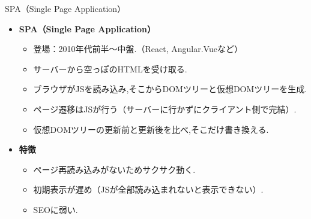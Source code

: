 \documentclass[aspectratio=169]{beamer}
\begin{document}
\begin{frame}{SPA（Single Page Application）}
    \begin{itemize}
        \setlength{\parskip}{1em}
        \item\textbf{SPA（Single Page Application）}
        \begin{itemize}
            \setlength{\parskip}{1em}
            \item 登場：2010年代前半～中盤.（React, Angular.Vueなど）
            \item サーバーから空っぽのHTMLを受け取る.
            \item ブラウザがJSを読み込み,そこからDOMツリーと仮想DOMツリーを生成.
            \item ページ遷移はJSが行う（サーバーに行かずにクライアント側で完結）.
            \item 仮想DOMツリーの更新前と更新後を比べ,そこだけ書き換える.
        \end{itemize}
        \item\textbf{特徴}
        \begin{itemize}
            \setlength{\parskip}{1em}
            \item ページ再読み込みがないためサクサク動く.
            \item 初期表示が遅め（JSが全部読み込まれないと表示できない）.
            \item SEOに弱い.
        \end{itemize}
    \end{itemize}
\end{frame}
\end{document}
